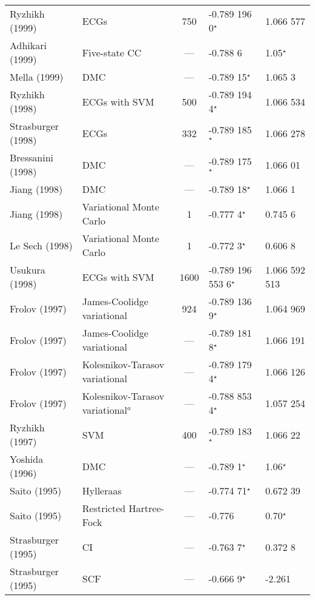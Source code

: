 \documentclass[Dissertation.tex]{subfiles}
\begin{document}
{\begin{center}
\begin{longtable}{l l c l l}
Ryzhikh (1999) \cite{Ryzhikh1999} & ECGs & 750 & -0.789 196 0$^\star$ & 1.066 577 \\
Adhikari (1999) \cite{Adhikari1999} & Five-state CC & --- & -0.788 6 & 1.05$^\star$ \\
Mella (1999) \cite{Mella1999} & DMC & --- & -0.789 15$^\star$ & 1.065 3 \\
Ryzhikh (1998) \cite{Ryzhikh1998} & ECGs with SVM & 500 & -0.789 194 4$^\star$ & 1.066 534 \\
Strasburger (1998) \cite{Strasburger1998} & ECGs & 332 & -0.789 185$^\star$ & 1.066 278 \\
Bressanini (1998) \cite{Bressanini1998} & DMC & --- & -0.789 175$^\star$ & 1.066 01 \\
Jiang (1998) \cite{Jiang1998} & DMC & --- & -0.789 18$^\star$ & 1.066 1 \\
Jiang (1998) \cite{Jiang1998} & Variational Monte Carlo & 1 & -0.777 4$^\star$ & 0.745 6 \\
Le Sech (1998) \cite{LeSech1998} & Variational Monte Carlo & 1 & -0.772 3$^\star$ & 0.606 8 \\
Usukura (1998) \cite{Usukura1998} & ECGs with SVM & 1600 & -0.789 196 553 6$^\star$ & 1.066 592 513 \\
Frolov (1997) \cite{Frolov1997a} & James-Coolidge variational & 924 & -0.789 136 9$^\star$ & 1.064 969 \\
Frolov (1997) \cite{Frolov1997a} & James-Coolidge variational & --- & -0.789 181 8$^\star$ & 1.066 191 \\
Frolov (1997) \cite{Frolov1997c} & Kolesnikov-Tarasov variational & --- & -0.789 179 4$^\star$ & 1.066 126 \\
Frolov (1997) \cite{Frolov1997c} & Kolesnikov-Tarasov variational$^a$ & --- & -0.788 853 4$^\star$ & 1.057 254 \\
Ryzhikh (1997) \cite{Ryzhikh1997} & SVM & 400 & -0.789 183$^\star$ & 1.066 22 \\
Yoshida (1996) \cite{Yoshida1996} & DMC & --- & -0.789 1$^\star$ & 1.06$^\star$ \\
Saito (1995) \cite{Saito1995a} & Hylleraas & --- & -0.774 71$^\star$ & 0.672 39 \\*
Saito (1995) \cite{Saito1995} & Restricted Hartree-Fock & --- & -0.776 & 0.70$^\star$ \\*
Strasburger (1995) \cite{Strasburger1995} & CI & --- & -0.763 7$^\star$ & 0.372 8 \\*
Strasburger (1995) \cite{Strasburger1995} & SCF & --- & -0.666 9$^\star$ & -2.261 \\*

\end{longtable}
\end{center}}
\end{document}
